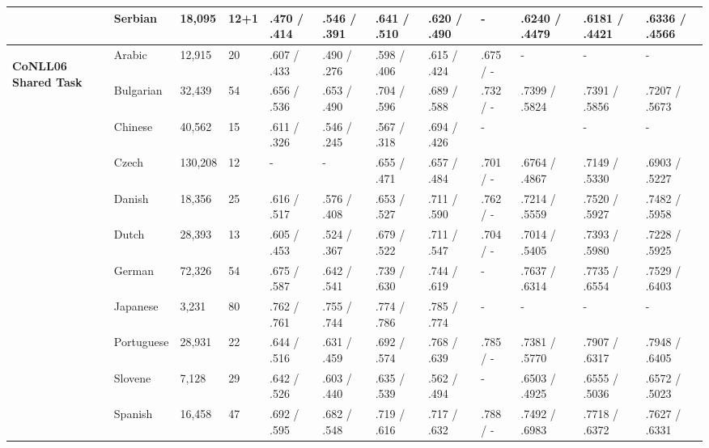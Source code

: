 \begin{landscape}
\begin{table}[ht]
\begin{tabular}{|l|l|l|l|p{1.5cm}|p{1.5cm}|p{1.5cm}|p{1.5cm}|p{1.5cm}|p{2cm}|p{2cm}|p{2cm}|}
        & Serbian    & 18,095  & 12+1 & .470 / .414   & .546 / .391   & .641 / .510   & .620 / .490   & -          & .6240 / .4479  & .6181 / .4421     & .6336 / .4566 \\
        \hline %
        \multirow{13}{*}{\begin{sideways}\textbf{CoNLL06 Shared Task}\end{sideways}}
        & Arabic       & 12,915  & 20   & .607 / .433   & .490 / .276   & .598 / .406   & .615 / .424   & .675 / -   & - & -               & -  \\
        & Bulgarian  & 32,439  & 54   & .656 / .536   & .653 / .490   & .704 / .596   & .689 / .588   & .732 / -   & .7399 / .5824  & .7391 / .5856     & .7207 / .5673 \\
        & Chinese    & 40,562  & 15   & .611 / .326   & .546 / .245   & .567 / .318   & .694 / .426   & -          & & -               & -           \\
        & Czech      & 130,208 & 12   & -             & -            & .655 / .471   & .657 / .484    & .701 / -   & .6764 / .4867  & .7149 / .5330     & .6903 / .5227 \\
        & Danish     & 18,356  & 25   & .616 / .517   & .576 / .408   & .653 / .527   & .711 / .590   & .762 / -   & .7214 / .5559  & .7520 / .5927     & .7482 / .5958 \\
        & Dutch      & 28,393  & 13   & .605 / .453   & .524 / .367   & .679 / .522   & .711 / .547   & .704 / -   & .7014 / .5405  & .7393 / .5980     & .7228 / .5925 \\
        & German     & 72,326  & 54   & .675 / .587   & .642 / .541   & .739 / .630   & .744 / .619   & -          & .7637 / .6314  & .7735 / .6554     & .7529 / .6403 \\
        & Japanese   & 3,231   & 80   & .762 / .761   & .755 / .744   & .774 / .786   & .785 / .774   & -          & - & -               & -           \\
        & Portuguese & 28,931  & 22   & .644 / .516   & .631 / .459   & .692 / .574   & .768 / .639   & .785 / -   & .7381 / .5770  & .7907 / .6317     & .7948 / .6405 \\
        & Slovene    & 7,128   & 29   & .642 / .526   & .603 / .440   & .635 / .539   & .562 / .494   & -          & .6503 / .4925  & .6555 / .5036     & .6572 / .5023 \\
        & Spanish    & 16,458  & 47   & .692 / .595   & .682 / .548   & .719 / .616   & .717 / .632   & .788 / -   & .7492 / .6983  & .7718 / .6372     & .7627 / .6331 \\

\end{tabular}
\end{table}
\end{landscape}
